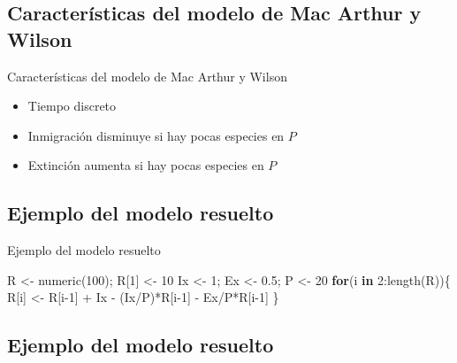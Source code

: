 \documentclass[
  11pt,
  ignorenonframetext,
]{beamer}
\newenvironment{Shaded}{}{}
\newcommand{\ControlFlowTok}[1]{\textcolor[rgb]{0.00,0.44,0.13}{\textbf{#1}}}
\newcommand{\DecValTok}[1]{\textcolor[rgb]{0.25,0.63,0.44}{#1}}
\newcommand{\FloatTok}[1]{\textcolor[rgb]{0.25,0.63,0.44}{#1}}
\newcommand{\FunctionTok}[1]{\textcolor[rgb]{0.02,0.16,0.49}{#1}}
\newcommand{\NormalTok}[1]{#1}
\newcommand{\OtherTok}[1]{\textcolor[rgb]{0.00,0.44,0.13}{#1}}
\newcommand{\SpecialCharTok}[1]{\textcolor[rgb]{0.25,0.44,0.63}{#1}}
\begin{document}
\hypertarget{caracteruxedsticas-del-modelo-de-mac-arthur-y-wilson}{%
\subsection{Características del modelo de Mac Arthur y
Wilson}\label{caracteruxedsticas-del-modelo-de-mac-arthur-y-wilson}}

\begin{frame}{Características del modelo de Mac Arthur y Wilson}
\begin{itemize}
\item
  Tiempo discreto
\item
  Inmigración disminuye si hay pocas especies en \(P\)
\item
  Extinción aumenta si hay pocas especies en \(P\)
\end{itemize}
\end{frame}

\hypertarget{ejemplo-del-modelo-resuelto}{%
\subsection{Ejemplo del modelo
resuelto}\label{ejemplo-del-modelo-resuelto}}

\begin{frame}[fragile]{Ejemplo del modelo resuelto}
\begin{Shaded}
\begin{Highlighting}[]
\NormalTok{R }\OtherTok{\textless{}{-}} \FunctionTok{numeric}\NormalTok{(}\DecValTok{100}\NormalTok{); R[}\DecValTok{1}\NormalTok{] }\OtherTok{\textless{}{-}} \DecValTok{10}
\NormalTok{Ix }\OtherTok{\textless{}{-}} \DecValTok{1}\NormalTok{; Ex }\OtherTok{\textless{}{-}} \FloatTok{0.5}\NormalTok{; P }\OtherTok{\textless{}{-}} \DecValTok{20}
\ControlFlowTok{for}\NormalTok{(i }\ControlFlowTok{in} \DecValTok{2}\SpecialCharTok{:}\FunctionTok{length}\NormalTok{(R))\{}
\NormalTok{  R[i] }\OtherTok{\textless{}{-}}\NormalTok{ R[i}\DecValTok{{-}1}\NormalTok{] }\SpecialCharTok{+}\NormalTok{ Ix }\SpecialCharTok{{-}}\NormalTok{ (Ix}\SpecialCharTok{/}\NormalTok{P)}\SpecialCharTok{*}\NormalTok{R[i}\DecValTok{{-}1}\NormalTok{] }\SpecialCharTok{{-}}\NormalTok{ Ex}\SpecialCharTok{/}\NormalTok{P}\SpecialCharTok{*}\NormalTok{R[i}\DecValTok{{-}1}\NormalTok{]}
\NormalTok{\}}
\end{Highlighting}
\end{Shaded}
\end{frame}

\hypertarget{ejemplo-del-modelo-resuelto-1}{%
\subsection{Ejemplo del modelo
resuelto}\label{ejemplo-del-modelo-resuelto-1}}
\end{document}
